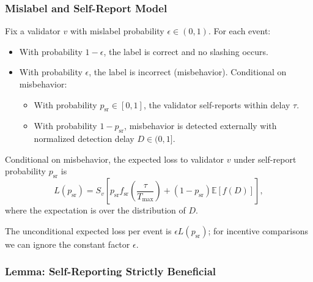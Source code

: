 \documentclass[11pt]{article}
\begin{document}
\subsubsection{Mislabel and Self-Report Model}

\begin{definition}
\label{def:mislabel-model-app}
Fix a validator \(v\) with mislabel probability \(\epsilon \in (0,1)\). For each event:
\begin{itemize}[leftmargin=*]
  \item With probability \(1-\epsilon\), the label is correct and no slashing occurs.
  \item With probability \(\epsilon\), the label is incorrect (misbehavior). Conditional on misbehavior:
  \begin{itemize}
    \item With probability \(p_{\mathrm{sr}} \in [0,1]\), the validator self-reports within delay \(\tau\).
    \item With probability \(1-p_{\mathrm{sr}}\), misbehavior is detected externally with normalized detection delay \(D \in (0,1]\).
  \end{itemize}
\end{itemize}
\end{definition}

\begin{definition}
\label{def:loss-app}
Conditional on misbehavior, the expected loss to validator \(v\) under self-report probability \(p_{\mathrm{sr}}\) is
\[
L(p_{\mathrm{sr}})
= S_v\left[
  p_{\mathrm{sr}} f_{\mathrm{sr}}\!\left(\frac{\tau}{T_{\max}}\right)
  + (1-p_{\mathrm{sr}})\mathbb{E}[f(D)]
\right],
\]
where the expectation is over the distribution of \(D\).
\end{definition}

The unconditional expected loss per event is \(\epsilon L(p_{\mathrm{sr}})\); for incentive comparisons we can ignore the constant factor \(\epsilon\).

\subsubsection{Lemma: Self-Reporting Strictly Beneficial}
\end{document}
